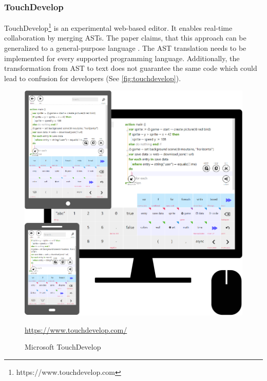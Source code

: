 \subsubsection{TouchDevelop}
TouchDevelop\footnote{https://www.touchdevelop.com} is an experimental web-based editor. It enables real-time collaboration by merging ASTs. The paper claims, that this approach can be generalized to a general-purpose language \cite{ProtzenkoBurckhardtMoskalMcClurg:2015:Implementingreal-timecollaborationinTouchDevelopusingASTmerges}. The AST translation needs to be implemented for every supported programming language. Additionally, the transformation from AST to text does not guarantee the same code which could lead to confusion for developers (See \autoref{fig:touchdevelop}).
\begin{figure}[hb]
    \centering
    \includegraphics[width=0.7\linewidth]{figures/screenshots/touchdevelop.png}
	\caption{Microsoft TouchDevelop }
	\href{https://www.touchdevelop.com/}{https://www.touchdevelop.com/}
    \label{fig:touchdevelop}
\end{figure}
